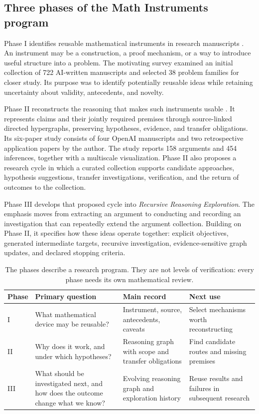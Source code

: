 \subsection{Three phases of the Math Instruments program}

Phase I identifies reusable mathematical instruments in research manuscripts \cite{xie1}. An instrument may be a construction, a proof mechanism, or a way to introduce useful structure into a problem. The motivating survey examined an initial collection of 722 AI-written manuscripts and selected 38 problem families for closer study. Its purpose was to identify potentially reusable ideas while retaining uncertainty about validity, antecedents, and novelty.

Phase II reconstructs the reasoning that makes such instruments usable \cite{xie2}. It represents claims and their jointly required premises through source-linked directed hypergraphs, preserving hypotheses, evidence, and transfer obligations. Its six-paper study consists of four OpenAI manuscripts and two retrospective application papers by the author. The study reports 158 arguments and 454 inferences, together with a multiscale visualization. Phase II also proposes a research cycle in which a curated collection supports candidate approaches, hypothesis suggestions, transfer investigations, verification, and the return of outcomes to the collection.

Phase III develops that proposed cycle into \emph{Recursive Reasoning Exploration}. The emphasis moves from extracting an argument to conducting and recording an investigation that can repeatedly extend the argument collection. Building on Phase II, it specifies how these ideas operate together: explicit objectives, generated intermediate targets, recursive investigation, evidence-sensitive graph updates, and declared stopping criteria.

\begin{table}[htbp]
\centering\small
\begin{tabularx}{\linewidth}{@{}p{1.35cm}YYY@{}}
\toprule
Phase & Primary question & Main record & Next use \\
\midrule
I & What mathematical device may be reusable? & Instrument, source, antecedents, caveats & Select mechanisms worth reconstructing \\
II & Why does it work, and under which hypotheses? & Reasoning graph with scope and transfer obligations & Find candidate routes and missing premises \\
III & What should be investigated next, and how does the outcome change what we know? & Evolving reasoning graph and exploration history & Reuse results and failures in subsequent research \\
\bottomrule
\end{tabularx}
\caption{The phases describe a research program. They are not levels of verification: every phase needs its own mathematical review.}
\label{tab:phases}
\end{table}

